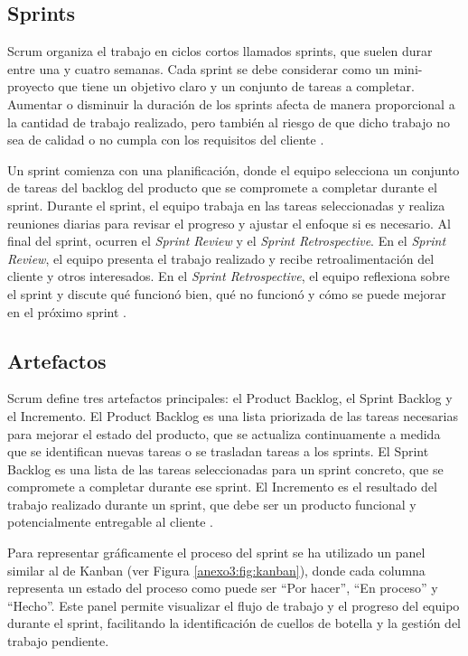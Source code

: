 \subsection{Sprints}
\label{anexo3:subsec:sprints}
Scrum organiza el trabajo en ciclos cortos llamados sprints, que suelen durar entre una y cuatro
semanas. Cada sprint se debe considerar como un mini-proyecto que tiene un objetivo claro y
un conjunto de tareas a completar. Aumentar o disminuir la duración de los sprints afecta de
manera proporcional a la cantidad de trabajo realizado, pero también al riesgo de que dicho
trabajo no sea de calidad o no cumpla con los requisitos del cliente \parencite{schwaber2020scrum}.

Un sprint comienza con una planificación, donde el equipo selecciona un conjunto de tareas del
backlog del producto que se compromete a completar durante el sprint. Durante el sprint, el
equipo trabaja en las tareas seleccionadas y realiza reuniones diarias para revisar el progreso
y ajustar el enfoque si es necesario. Al final del sprint, ocurren el \textit{Sprint Review} y el
\textit{Sprint Retrospective}. En el \textit{Sprint Review}, el equipo presenta el trabajo realizado
y recibe retroalimentación del cliente y otros interesados. En el \textit{Sprint Retrospective}, el
equipo reflexiona sobre el sprint y discute qué funcionó bien, qué no funcionó y cómo se puede
mejorar en el próximo sprint \parencite{schwaber2020scrum}.

\subsection{Artefactos}
\label{anexo3:subsec:artefactos}
Scrum define tres artefactos principales: el Product Backlog, el Sprint Backlog y el Incremento.
El Product Backlog es una lista priorizada de las tareas necesarias para mejorar el estado del
producto, que se actualiza continuamente a medida que se identifican nuevas tareas o se trasladan
tareas a los sprints. El Sprint Backlog es una lista de las tareas seleccionadas para un sprint
concreto, que se compromete a completar durante ese sprint. El Incremento es el resultado del
trabajo realizado durante un sprint, que debe ser un producto funcional y potencialmente
entregable al cliente \parencite{schwaber2020scrum}.

Para representar gráficamente el proceso del sprint se ha utilizado un panel similar al de Kanban
(ver Figura \ref{anexo3:fig:kanban}), donde cada columna representa un estado del proceso
como puede ser \enquote{Por hacer}, \enquote{En proceso} y \enquote{Hecho}. Este panel permite visualizar
el flujo de trabajo y el progreso del equipo durante el sprint, facilitando la identificación de cuellos
de botella y la gestión del trabajo pendiente.

